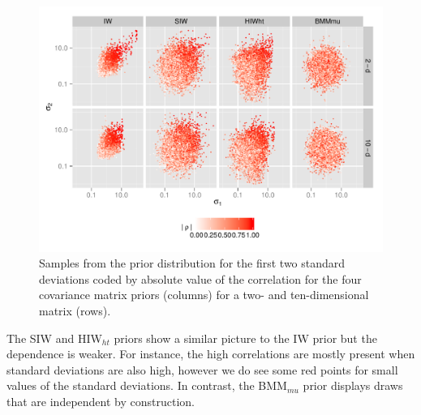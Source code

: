 \documentclass[12pt]{article}
\begin{document}
\begin{figure}[htbp]
\begin{center}
 \includegraphics[width=\textwidth ]{prior_sis2} 
  \vspace{-.5in}
\caption{Samples from the prior distribution for the first two standard deviations coded by absolute value of the correlation for the four covariance matrix priors (columns) for a two- and ten-dimensional matrix (rows).}
\label{priorF2} 
\end{center}
\end{figure}

The SIW and HIW$_{ht}$ priors show a similar picture to the IW prior but the dependence is weaker. For instance, the high correlations are mostly present when standard deviations are also high, however we do see some red points for small values of the standard deviations. In contrast, the BMM$_{mu}$ prior displays draws that are independent by construction. 
\end{document}
